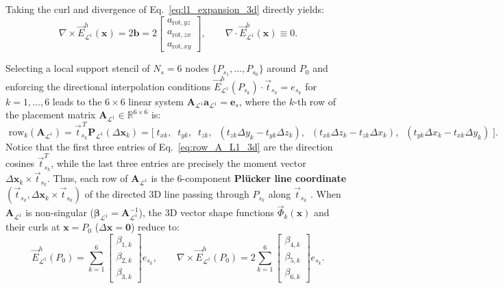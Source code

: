 \documentclass[preprint,12pt]{elsarticle}
\newcommand{\curl}{\nabla \times}
\newcommand{\divg}{\nabla \cdot}
\newcommand{\R}{\mathbb{R}}
\begin{document}
Taking the curl and divergence of Eq.~\eqref{eq:l1_expansion_3d} directly yields:
\begin{equation}
    \curl \vec{E}^h_{\mathcal{L}^1}(\mathbf{x}) = 2\mathbf{b} = 2\begin{bmatrix} a_{\text{rot},yz} \\ a_{\text{rot},zx} \\ a_{\text{rot},xy} \end{bmatrix}, \qquad \divg \vec{E}^h_{\mathcal{L}^1}(\mathbf{x}) \equiv 0.
    \label{eq:l1_curl_div_3d}
\end{equation}

Selecting a local support stencil of $N_s = 6$ nodes $\{P_{s_1}, \dots, P_{s_6}\}$ around $P_0$ and enforcing the directional interpolation conditions $\vec{E}^h_{\mathcal{L}^1}(P_{s_k}) \cdot \vec{t}_{s_k} = e_{s_k}$ for $k = 1, \dots, 6$ leads to the $6\times 6$ linear system $\mathbf{A}_{\mathcal{L}^1} \mathbf{a}_{\mathcal{L}^1} = \mathbf{e}_s$, where the $k$-th row of the placement matrix $\mathbf{A}_{\mathcal{L}^1} \in \R^{6\times 6}$ is:
\begin{equation}
    \text{ row}_k(\mathbf{A}_{\mathcal{L}^1}) = \vec{t}_{s_k}^{\,T} \mathbf{P}_{\mathcal{L}^1}(\Delta\mathbf{x}_k) = \Big[\; t_{xk}, \;\; t_{yk}, \;\; t_{zk}, \;\; (t_{zk}\Delta y_k - t_{yk}\Delta z_k), \;\; (t_{xk}\Delta z_k - t_{zk}\Delta x_k), \;\; (t_{yk}\Delta x_k - t_{xk}\Delta y_k) \;\Big].
    \label{eq:row_A_L1_3d}
\end{equation}
Notice that the first three entries of Eq.~\eqref{eq:row_A_L1_3d} are the direction cosines $\vec{t}_{s_k}^T$, while the last three entries are precisely the moment vector $\Delta\mathbf{x}_k \times \vec{t}_{s_k}$. Thus, each row of $\mathbf{A}_{\mathcal{L}^1}$ is the 6-component \textbf{Pl\"{u}cker line coordinate} $(\vec{t}_{s_k}, \Delta\mathbf{x}_k \times \vec{t}_{s_k})$ of the directed 3D line passing through $P_{s_k}$ along $\vec{t}_{s_k}$ \cite{Pottmann2001}. When $\mathbf{A}_{\mathcal{L}^1}$ is non-singular ($\bm{\beta}_{\mathcal{L}^1} = \mathbf{A}_{\mathcal{L}^1}^{-1}$), the 3D vector shape functions $\vec{\Phi}_k(\mathbf{x})$ and their curls at $\mathbf{x} = P_0$ ($\Delta\mathbf{x} = \mathbf{0}$) reduce to:
\begin{equation}
    \vec{E}^h_{\mathcal{L}^1}(P_0) = \sum_{k=1}^{6} \begin{bmatrix} \beta_{1,k} \\ \beta_{2,k} \\ \beta_{3,k} \end{bmatrix} e_{s_k}, \qquad
    \curl\vec{E}^h_{\mathcal{L}^1}(P_0) = 2 \sum_{k=1}^{6} \begin{bmatrix} \beta_{4,k} \\ \beta_{5,k} \\ \beta_{6,k} \end{bmatrix} e_{s_k}.
    \label{eq:l1_eval_p0_3d}
\end{equation}
\end{document}

